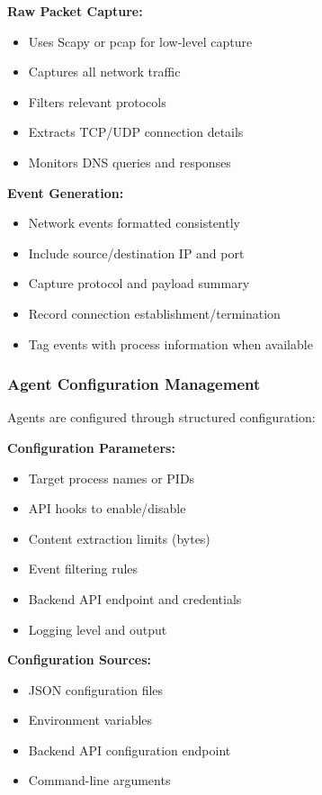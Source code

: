 \textbf{Raw Packet Capture:}
\begin{itemize}
    \item Uses Scapy or pcap for low-level capture
    \item Captures all network traffic
    \item Filters relevant protocols
    \item Extracts TCP/UDP connection details
    \item Monitors DNS queries and responses
\end{itemize}

\textbf{Event Generation:}
\begin{itemize}
    \item Network events formatted consistently
    \item Include source/destination IP and port
    \item Capture protocol and payload summary
    \item Record connection establishment/termination
    \item Tag events with process information when available
\end{itemize}

\subsubsection{Agent Configuration Management}

Agents are configured through structured configuration:

\textbf{Configuration Parameters:}
\begin{itemize}
    \item Target process names or PIDs
    \item API hooks to enable/disable
    \item Content extraction limits (bytes)
    \item Event filtering rules
    \item Backend API endpoint and credentials
    \item Logging level and output
\end{itemize}

\textbf{Configuration Sources:}
\begin{itemize}
    \item JSON configuration files
    \item Environment variables
    \item Backend API configuration endpoint
    \item Command-line arguments
\end{itemize}

